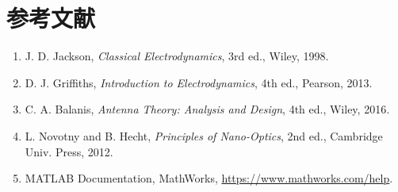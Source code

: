\documentclass[11pt,a4paper]{article}
\begin{document}
\section{参考文献}
\begin{enumerate}
    \item J. D. Jackson, \textit{Classical Electrodynamics}, 3rd ed.,
          Wiley, 1998.
    \item D. J. Griffiths, \textit{Introduction to Electrodynamics},
          4th ed., Pearson, 2013.
    \item C. A. Balanis, \textit{Antenna Theory: Analysis and Design},
          4th ed., Wiley, 2016.
    \item L. Novotny and B. Hecht, \textit{Principles of Nano-Optics},
          2nd ed., Cambridge Univ. Press, 2012.
    \item MATLAB Documentation, MathWorks, \url{https://www.mathworks.com/help}.
\end{enumerate}
\end{document}
